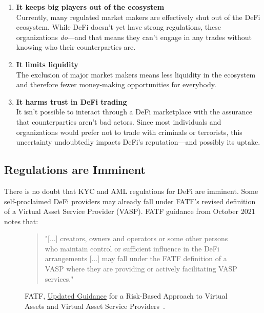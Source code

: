 \begin{enumerate}
\item \textbf{It keeps big players out of the ecosystem}\\
Currently, many regulated market makers are effectively shut out of the DeFi ecosystem. While DeFi doesn’t yet have strong regulations, these organizations \emph{do}—and that means they can’t engage in any trades without knowing who their counterparties are.

\item \textbf{It limits liquidity}\\
The exclusion of major market makers means less liquidity in the ecosystem and therefore fewer money-making opportunities for everybody.

\item \textbf{It harms trust in DeFi trading}\\
It isn’t possible to interact through a DeFi marketplace with the assurance that counterparties aren’t bad actors. Since most individuals and organizations would prefer not to trade with criminals or terrorists, this uncertainty undoubtedly impacts DeFi’s reputation—and possibly its uptake.

\end{enumerate}

\subsection{Regulations are Imminent}
There is no doubt that KYC and AML regulations for DeFi are imminent. Some self-proclaimed DeFi providers may already fall under FATF’s revised definition of a Virtual Asset Service Provider (VASP). FATF guidance from October 2021 notes that:

\begin{figure}[htbp]
\begin{quote}
\centering
"[...] creators, owners and operators or some other persons who maintain control or sufficient influence in the DeFi arrangements [...] may fall under the FATF definition of a VASP where they are providing or actively facilitating VASP services."
\caption{FATF, \href{https://www.fatf-gafi.org/publications/fatfrecommendations/documents/guidance-rba-virtual-assets-2021.html}{Updated Guidance} for a Risk-Based Approach to Virtual Assets and Virtual Asset Service Providers~\cite{fatf-guidance}.\label{cap:fatf-guidance}}
\end{quote}
\end{figure}

